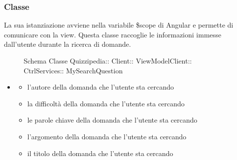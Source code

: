 \subsubsection{Classe }
La sua istanziazione avviene nella variabile \$scope di Angular e permette di comunicare con la view. Questa classe raccoglie le informazioni immesse dall'utente durante la ricerca di domande.
\begin{figure}[H]
\centering
\noindent{}
\caption[Schema Classe MySearchQuestion]{Schema Classe Quizzipedia:: Client:: ViewModelClient:: CtrlServices:: MySearchQuestion}
\end{figure}
\begin{itemize}
\item {}
\begin{itemize}
\item {}
\newline
l'autore della domanda che l'utente sta cercando
\item {}
\newline
la difficoltà della domanda che l'utente sta cercando
\item {}
\newline
le parole chiave della domanda che l'utente sta cercando
\item {}
\newline
l'argomento della domanda che l'utente sta cercando
\item {}
\newline
il titolo della domanda che l'utente sta cercando
\end{itemize}
\end{itemize}
